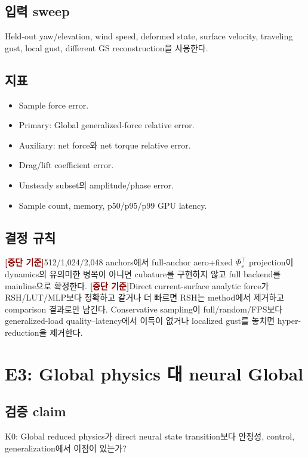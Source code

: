 \documentclass[11pt,a4paper]{article}
\newcommand{\killgate}{\textcolor{darkred}{\textbf{[중단 기준]}}}
\begin{document}
\subsection*{입력 sweep}

Held-out yaw/elevation, wind speed, deformed state,
surface velocity, traveling gust, local gust,
different GS reconstruction을 사용한다.

\subsection*{지표}

\begin{itemize}[leftmargin=1.5em]
  \item Sample force error.
  \item Primary: Global generalized-force relative error.
  \item Auxiliary: net force와 net torque relative error.
  \item Drag/lift coefficient error.
  \item Unsteady subset의 amplitude/phase error.
  \item Sample count, memory, p50/p95/p99 GPU latency.
\end{itemize}

\subsection*{결정 규칙}

\killgate 512/1,024/2,048 anchors에서 full-anchor aero+fixed \(\Phi_s^\top\) projection이
dynamics의 유의미한 병목이 아니면 cubature를 구현하지 않고 full backend를 mainline으로 확정한다.
\killgate Direct current-surface analytic force가 RSH/LUT/MLP보다
정확하고 같거나 더 빠르면 RSH는 method에서 제거하고 comparison 결과로만 남긴다.
Conservative sampling이 full/random/FPS보다 generalized-load quality--latency에서 이득이 없거나
localized gust를 놓치면 hyper-reduction을 제거한다.

\section{E3: Global physics 대 neural Global}

\subsection*{검증 claim}

K0: Global reduced physics가 direct neural state transition보다
안정성, control, generalization에서 이점이 있는가?
\end{document}
